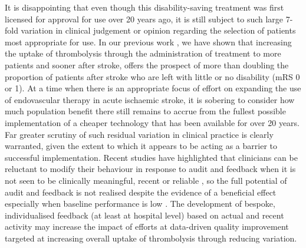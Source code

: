 It is disappointing that even though this disability-saving treatment was first licensed for approval for use over 20 years ago, it is still subject to such large 7-fold variation in clinical judgement or opinion regarding the selection of patients most appropriate for use. In our previous work \cite{allen_using_2022}, we have shown that increasing the uptake of thrombolysis through the administration of treatment to more patients and sooner after stroke, offers the prospect of more than doubling the proportion of patients after stroke who are left with little or no disability (mRS 0 or 1). At a time when there is an appropriate focus of effort on expanding the use of endovascular therapy in acute ischaemic stroke, it is sobering to consider how much population benefit there still remains to accrue from the fullest possible implementation of a cheaper technology that has been available for over 20 years. Far greater scrutiny of such residual variation in clinical practice is clearly warranted, given the extent to which it appears to be acting as a barrier to successful implementation. Recent studies have highlighted that clinicians can be reluctant to modify their behaviour in response to audit and feedback when it is not seen to be clinically meaningful, recent or reliable \cite{bekker_give_2022}, so the full potential of audit and feedback is not realised \cite{foy_revitalising_2020} despite the evidence of a beneficial effect especially when baseline performance is low \cite{ivers_audit_2012}. The development of bespoke, individualised feedback (at least at hospital level) based on actual and recent activity may increase the impact of efforts at data-driven quality improvement targeted at increasing overall uptake of thrombolysis through reducing variation.


